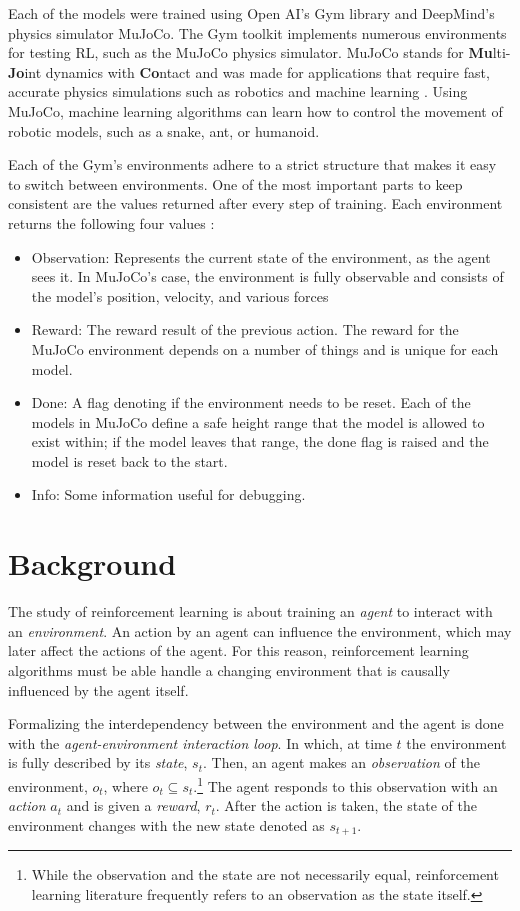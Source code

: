 \documentclass[conference]{IEEEtran}
\begin{document}
Each of the models were trained using Open AI's Gym library and DeepMind's physics simulator MuJoCo. The Gym toolkit implements numerous environments for testing RL, such as the MuJoCo physics simulator. MuJoCo stands for {\bf Mu}lti-{\bf Jo}int dynamics with {\bf Co}ntact and was made for applications that require fast, accurate physics simulations such as robotics and machine learning \cite{mujoco_docs}. Using MuJoCo, machine learning algorithms can learn how to control the movement of robotic models, such as a snake, ant, or humanoid.

Each of the Gym's environments adhere to a strict structure that makes it easy to switch between environments. One of the most important parts to keep consistent are the values returned after every step of training. Each environment returns the following four values \cite{gym_docs}:

\begin{itemize}
    \item Observation: Represents the current state of the environment, as the agent sees it. In MuJoCo's case, the          environment is fully observable and consists of the model's position, velocity, and various forces \cite{gym_source}
    \item Reward: The reward result of the previous action. The reward for the MuJoCo environment depends on a          number of things and is unique for each model.
    \item Done: A flag denoting if the environment needs to be reset. Each of the models in MuJoCo define a safe height range that the model is allowed to exist within; if the model leaves that range, the done flag is raised and the model is reset back to the start.
    \item Info: Some information useful for debugging.
\end{itemize}

\section{Background}

The study of reinforcement learning is about training an \textit{agent} to interact with an \textit{environment}. An action by an agent can influence the environment, which may later affect the actions of the agent. For this reason, reinforcement learning algorithms must be able handle a changing environment that is causally influenced by the agent itself.

Formalizing the interdependency between the environment and the agent is done with the \textit{agent-environment interaction loop}. In which, at time $t$ the environment is fully described by its \textit{state}, $s_t$. Then, an agent makes an \textit{observation} of the environment, $o_t$, where $o_t \subseteq s_t$.\footnote{While the observation and the state are not necessarily equal, reinforcement learning literature frequently refers to an observation as the state itself.} The agent responds to this observation with an \textit{action} $a_t$ and is given a \textit{reward}, $r_t$. After the action is taken, the state of the environment changes with the new state denoted as $s_{t+1}$.
\end{document}
